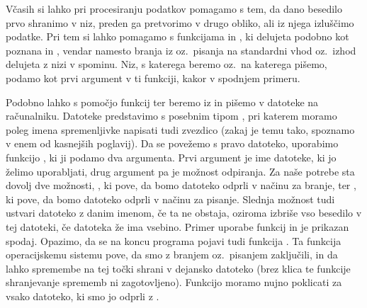 
Včasih si lahko pri procesiranju podatkov pomagamo s tem, da dano besedilo prvo
shranimo v niz, preden ga pretvorimo v drugo obliko, ali iz njega izluščimo
podatke.
Pri tem si lahko pomagamo s funkcijama  in , ki
delujeta podobno kot poznana  in , vendar namesto
branja iz oz.~pisanja na standardni vhod oz.~izhod delujeta z nizi v spominu.
Niz, s katerega beremo oz.~na katerega pišemo, podamo kot prvi argument v ti
funkciji, kakor v spodnjem primeru.


Podobno lahko s pomočjo funkcij  ter  beremo iz in
pišemo v datoteke na računalniku.
Datoteke predstavimo s posebnim tipom , pri katerem moramo poleg
imena spremenljivke napisati tudi zvezdico (zakaj je temu tako, spoznamo v enem
od kasnejših poglavij).
Da se povežemo s pravo datoteko, uporabimo funkcijo , ki ji podamo
dva argumenta.
Prvi argument je ime datoteke, ki jo želimo uporabljati, drug argument pa je
možnost odpiranja.
Za naše potrebe sta dovolj dve možnosti, , ki pove, da bomo datoteko
odprli v načinu za branje, ter , ki pove, da bomo datoteko odprli v
načinu za pisanje.
Slednja možnost tudi ustvari datoteko z danim imenom, če ta ne obstaja, oziroma
izbriše vso besedilo v tej datoteki, če datoteka že ima vsebino.
Primer uporabe funkcij  in  je prikazan spodaj.
Opazimo, da se na koncu programa pojavi tudi funkcija .
Ta funkcija operacijskemu sistemu pove, da smo z branjem oz.~pisanjem
zaključili, in da lahko spremembe na tej točki shrani v dejansko datoteko (brez
klica te funkcije shranjevanje sprememb ni zagotovljeno).
Funkcijo moramo nujno poklicati za vsako datoteko, ki smo jo odprli z
.


